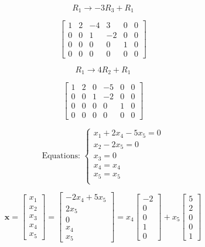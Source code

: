 \documentclass[12pt, a4paper]{article}
\begin{document}
\[
    R_1 \rightarrow -3R_3 + R_1
\]

\[
    \begin{bmatrix}
        1 & 2 & -4 & 3 & 0 & 0 \\
        0 & 0 & 1 & -2 & 0 & 0 \\
        0 & 0 & 0 & 0 & 1 & 0 \\
        0 & 0 & 0 & 0 & 0 & 0
    \end{bmatrix}
\]

\[
    R_1 \rightarrow 4R_2 + R_1
\]

\[
    \begin{bmatrix}
        1 & 2 & 0 & -5 & 0 & 0 \\
        0 & 0 & 1 & -2 & 0 & 0 \\
        0 & 0 & 0 & 0 & 1 & 0\\
        0 & 0 & 0 & 0 & 0 & 0
    \end{bmatrix}
\]

\newpage

\[
    \text{Equations: }\begin{cases}
        x_1 + 2x_4 - 5x_5 = 0 \\
        x_2 - 2x_5 = 0 \\
        x_3 = 0 \\
        x_4 = x_4 \\
        x_5 = x_5 \\
    \end{cases}
\]

\[
    \boldsymbol{x}= \begin{bmatrix}
        x_1 \\
        x_2 \\
        x_3 \\
        x_4 \\
        x_5
    \end{bmatrix} = \begin{bmatrix}
        -2x_4 + 5x_5 \\
        2x_5 \\
        0 \\
        x_4 \\
        x_5
    \end{bmatrix} = x_4\begin{bmatrix}
        -2 \\
        0 \\
        0 \\
        1 \\
        0
    \end{bmatrix} + x_5\begin{bmatrix}
        5 \\
        2 \\
        0 \\
        0 \\
        1
    \end{bmatrix}
\]
\end{document}
